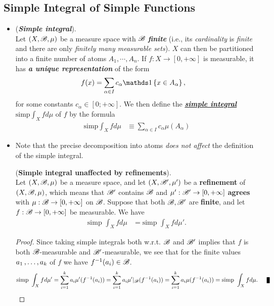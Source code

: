 \documentclass[11pt]{article}
\begin{document}
\subsection{Simple Integral of Simple Functions}
\begin{itemize}
\item \begin{definition} (\emph{\textbf{Simple integral}}).\\
 Let $(X, {\mathscr B}, \mu)$ be a measure space with ${\mathscr B}$ \emph{\textbf{finite}} (i.e., its \emph{cardinality} is \emph{finite} and there are only \emph{finitely many measurable sets}). $X$ can then be partitioned into a finite number of atoms $A_1, \cdots, A_n$. If $f : X \rightarrow [0, +\infty]$ is measurable, it has \emph{\textbf{a unique representation}} of the form
\begin{align*}
f(x)&= \sum_{\alpha \in I}c_{\alpha}\ind{x\in A_{\alpha}},
\end{align*} 
for some constants $c_{\alpha} \in [0;+\infty]$. We then define the \underline{\emph{\textbf{simple integral}}}
$\text{simp}\int_{X} f d\mu$ of $f$ by the formula
\begin{align*}
\text{simp}\int_{X} f d\mu &\equiv \sum_{\alpha\in I}c_{\alpha}\mu(A_{\alpha})
\end{align*} 
\end{definition}


\item \begin{remark}
Note that the precise decomposition into atoms \emph{does not affect} the definition of the simple integral. 

\begin{proposition}\label{prop: simple_integral_refinement} (\textbf{Simple integral unaffected by refinements}).  \citep{tao2011introduction} \\
Let $(X, {\mathscr B}, \mu)$ be a measure space, and let $(X, {\mathscr B}', \mu')$ be a \textbf{refinement} of $(X, {\mathscr B}, \mu)$, which means that ${\mathscr B}'$ contains ${\mathscr B}$ and $\mu': {\mathscr B}' \rightarrow [0, +\infty]$ \textbf{agrees} with $\mu: {\mathscr B} \rightarrow [0, +\infty]$ on ${\mathscr B}$. Suppose that both ${\mathscr B}, {\mathscr B}'$ are \textbf{finite}, and let $f: {\mathscr B} \rightarrow [0, +\infty]$ be measurable. We have
\begin{align*}
\text{simp }\int_{X} f d\mu &= \text{simp }\int_{X} f d\mu'.
\end{align*}
\end{proposition}
\begin{proof}
Since taking simple integrals both w.r.t. ${\mathscr B}$  and ${\mathscr B}'$  implies that $f$ is both ${\mathscr B}$-measurable and ${\mathscr B}'$-measurable, we see that for the finite values $a_1 \,{,}\ldots{,}\, a_k$  of $f$  we have $f^{-1}(a_i) \in {\mathscr B}$.
\begin{align*}
\text{simp }\int_{X} f d\mu' = \sum_{i=1}^{k}a_i \mu'(f^{-1}(a_i)) = \sum_{i=1}^{k}a_i \mu'|_{\srB}(f^{-1}(a_i)) = \sum_{i=1}^{k}a_i \mu(f^{-1}(a_i)) = \text{simp }\int_{X} f d\mu. \qed
\end{align*}
\end{proof}
\end{remark}



\end{itemize}
\end{document}
